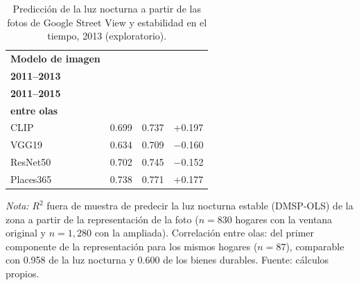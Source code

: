 \begin{table}[H]
  \centering
  \caption{Predicción de la luz nocturna a partir de las fotos de Google Street View y estabilidad en el tiempo, 2013 (exploratorio).}
  \label{tab:gsv_prediccion_luz}
  \footnotesize
  \setlength{\tabcolsep}{6pt}
  \begin{tabular}{lccc}
    \toprule
    \textbf{Modelo de imagen} & \shortstack{\textbf{$R^2$, ventana}\\\textbf{2011--2013}} & \shortstack{\textbf{$R^2$, ventana}\\\textbf{2011--2015}} & \shortstack{\textbf{Correlación}\\\textbf{entre olas}} \\
    \midrule
    CLIP & 0.699 & 0.737 & +0.197 \\
    VGG19 & 0.634 & 0.709 & $-$0.160 \\
    ResNet50 & 0.702 & 0.745 & $-$0.152 \\
    Places365 & 0.738 & 0.771 & +0.177 \\
    \bottomrule
  \end{tabular}
  \begin{minipage}{0.95\textwidth}
    \vspace{4pt}
    \footnotesize \textit{Nota:} $R^2$ fuera de muestra de predecir la luz nocturna estable (DMSP-OLS) de la zona a partir de la representación de la foto ($n=830$ hogares con la ventana original y $n=1{,}280$ con la ampliada). Correlación entre olas: del primer componente de la representación para los mismos hogares ($n=87$), comparable con 0.958 de la luz nocturna y 0.600 de los bienes durables. Fuente: cálculos propios.
  \end{minipage}
\end{table}
